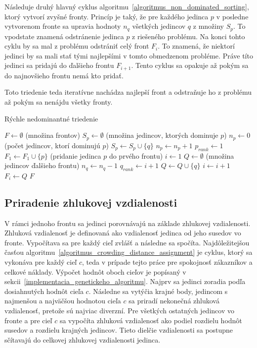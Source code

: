 Následuje druhý hlavný cyklus algoritmu~\ref{algoritmus_non_dominated_sorting}, ktorý vytvorí zvyšné fronty.
Princíp je taký, že pre každého jedinca $p$ v posledne vytvorenom fronte sa upravia hodnoty $n_q$ všetkých jedincov $q$ z množiny $S_p$.
To vpodstate znamená odstránenie jedinca $p$ z riešeného problému.
Na konci tohto cyklu by sa mal z problému odstrániť celý front $F_i$.
To znamená, že niektorí jedinci by sa mali stať tými najlepšími v tomto obmedzenom probléme.
Práve títo jedinci sa pridajú do ďalšieho frontu $F_{i+1}$.
Tento cyklus sa opakuje až pokým sa do najnovšieho frontu nemá kto pridať.

Toto triedenie teda iteratívne nachádza najlepší front a odstraňuje ho z problému až pokým sa nenájdu všetky fronty.

\vspace*{\dimexpr0.5\baselineskip\relax}
\begin{algorithm}[h]\label{algoritmus_non_dominated_sorting}
\caption{Rýchle nedominantné triedenie}
  $F \gets \emptyset$ (množina frontov)\;
   {
    $S_p \gets \emptyset$ (množina jedincov, ktorých dominuje $p$)\;
    $n_p \gets 0$ (počet jedincov, ktorí dominujú $p$)\;
     {
       {
        $S_p \gets S_p \cup \{q\}$\;
      }
       {
        $n_p \gets n_p + 1$\;
      }
    }
     {
      $p_{rank} \gets 1$\;
      $F_1 \gets F_1 \cup \{p\}$ (pridanie jedinca $p$ do prvého frontu)\;
    }
  }
  $i \gets 1$\;
   {
    $Q \gets \emptyset$ (množina jedincov ďalšieho frontu)\;
     {
       {
        $n_q \gets n_q - 1$\;
         {
          $q_{rank} \gets i + 1$\;
          $Q \gets Q \cup \{q\}$\;
        }
      }
    }
    $i \gets i + 1$\;
    $F_i \gets Q$\;
  }
  \Return $F$\;
\end{algorithm}

\subsection*{Priradenie zhlukovej vzdialenosti}
V rámci jednoho frontu sa jedinci porovnávajú na základe zhlukovej vzdialenosti.
Zhluková vzdialenosť je definovaná ako vzdialenosť jedinca od jeho susedov vo fronte.
Vypočítava sa pre každý cieľ zvlášť a následne sa spočíta.
Najdôležitejšou časťou algoritmu~\ref{algoritmus_crowding_distance_assignment} je cyklus, ktorý sa vykonáva pre každý cieľ $c$, teda v prípade tejto práce pre spokojnosť zákazníkov a celkové náklady.
Výpočet hodnôt oboch cieľov je popísaný v sekcii~\ref{implementacia_genetickeho_algoritmu}.
Najprv sa jedinci zoradia podľa dosiahnutých hodnôt cieľa $c$.
Následne sa vytýčia krajné body, jedincom s najmenšou a najväčšou hodnotou cieľa $c$ sa priradí nekonečná zhluková vzdialenosť, pretože sú najviac diverzní.
Pre všetkých ostatných jedincov vo fronte a pre cieľ $c$ sa vypočíta zhluková vzdialenosť ako podiel rozdielu hodnôt susedov a rozdielu krajných jedincov.
Tieto dielčie vzdialenosti sa postupne sčítavajú do celkovej zhlukovej vzdialenosti jedinca.


